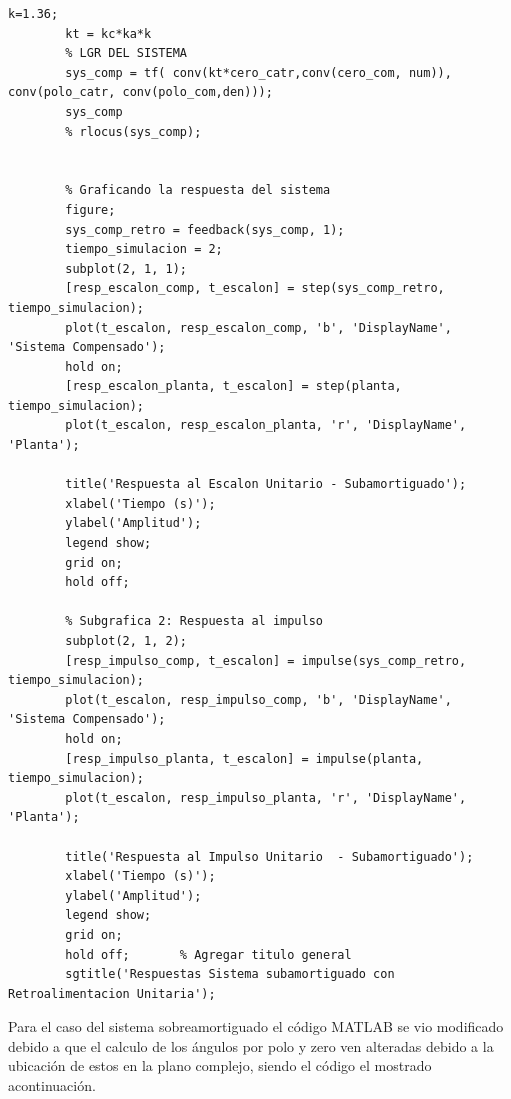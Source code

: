 \documentclass[conference]{IEEEtran}
\begin{document}
\begin{lstlisting}[numbers=none]
		k=1.36;
		kt = kc*ka*k
		% LGR DEL SISTEMA
		sys_comp = tf( conv(kt*cero_catr,conv(cero_com, num)), conv(polo_catr, conv(polo_com,den)));
		sys_comp
		% rlocus(sys_comp);
		
		
		% Graficando la respuesta del sistema
		figure;
		sys_comp_retro = feedback(sys_comp, 1);
		tiempo_simulacion = 2;
		subplot(2, 1, 1);
		[resp_escalon_comp, t_escalon] = step(sys_comp_retro, tiempo_simulacion);
		plot(t_escalon, resp_escalon_comp, 'b', 'DisplayName', 'Sistema Compensado');
		hold on;
		[resp_escalon_planta, t_escalon] = step(planta, tiempo_simulacion);
		plot(t_escalon, resp_escalon_planta, 'r', 'DisplayName', 'Planta');
		
		title('Respuesta al Escalon Unitario - Subamortiguado');
		xlabel('Tiempo (s)');
		ylabel('Amplitud');
		legend show;
		grid on; 
		hold off;
		
		% Subgrafica 2: Respuesta al impulso 
		subplot(2, 1, 2); 
		[resp_impulso_comp, t_escalon] = impulse(sys_comp_retro, tiempo_simulacion);
		plot(t_escalon, resp_impulso_comp, 'b', 'DisplayName', 'Sistema Compensado');
		hold on;
		[resp_impulso_planta, t_escalon] = impulse(planta, tiempo_simulacion);
		plot(t_escalon, resp_impulso_planta, 'r', 'DisplayName', 'Planta');
		
		title('Respuesta al Impulso Unitario  - Subamortiguado');
		xlabel('Tiempo (s)');
		ylabel('Amplitud'); 
		legend show;
		grid on; 
		hold off;		% Agregar titulo general 
		sgtitle('Respuestas Sistema subamortiguado con Retroalimentacion Unitaria');
	\end{lstlisting}
	Para el caso del sistema sobreamortiguado el código MATLAB se vio modificado debido a que el calculo de los ángulos por polo y zero ven alteradas debido a la ubicación de estos en la plano complejo, siendo el código el mostrado acontinuación.
	
\end{document}
